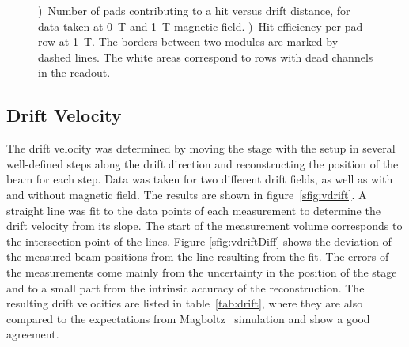 \documentclass[preprint]{elsarticle}
\begin{document}
\begin{figure}[tb]
\begin{subfigure}[b]{0.48\textwidth}
\iftoggle{blackandwhite}{\texttt{[image: figures/pulsesPerHitPaperBW.pdf]}}{\texttt{[image: figures/pulsesPerHitPaper.pdf]}}
\caption{}
\label{sfig:padsphit}
\end{subfigure}
\hfill
\begin{subfigure}[b]{0.48\textwidth}
\iftoggle{blackandwhite}{\texttt{[image: figures/HitEfficiency\_1T\_histoBW.pdf]}}{\texttt{[image: figures/HitEfficiency\_1T\_histo.pdf]}}
\caption{}
\label{sfig:hiteff}
\end{subfigure}
\caption{\small \protect{})~Number of pads contributing to a hit versus drift distance, for data taken at \SI{0}{\tesla} and \SI{1}{\tesla} magnetic field. \protect{})~Hit efficiency per pad row at \SI{1}{\tesla}. The borders between two modules are marked by dashed lines. The white areas correspond to rows with dead channels in the readout.}
\label{fig:padsHits}
\end{figure}


\subsection{Drift Velocity}
The drift velocity was determined by moving the stage with the setup in several well-defined steps along the drift direction and reconstructing the position of the beam for each step. Data was taken for two different drift fields, as well as with and without magnetic field. The results are shown in figure~\ref{sfig:vdrift}. A straight line was fit to the data points of each measurement to determine the drift velocity from its slope. The start of the measurement volume corresponds to the intersection point of the lines. Figure \ref{sfig:vdriftDiff} shows the deviation of the measured beam positions from the line resulting from the fit. The errors of the measurements come mainly from the uncertainty in the position of the stage and to a small part from the intrinsic accuracy of the reconstruction. 
The resulting drift velocities are listed in table~\ref{tab:drift}, where they are also compared to the expectations from Magboltz~\cite{Magboltz} simulation and show a good agreement.
\end{document}
